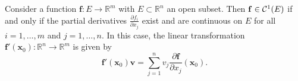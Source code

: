 \begin{thm}
  \label{thm:continuousParitialDerivativesImplyDifferentiability}
  Consider a function $\mathbf{f}: E\rightarrow \mathbb{R}^m$
  with $E\subset \mathbb{R}^n$ an open subset.
  Then $\mathbf{f}\in {\cal C}^1(E)$
  if and only if the partial derivatives $\frac{\partial f_i}{\partial x_j}$
  exist and are continuous on $E$ for all $i=1,\ldots,m$ and $j=1,\ldots,n$.
  In this case, the linear transformation
  $\mathbf{f}'(\mathbf{x}_0): \mathbb{R}^n \rightarrow \mathbb{R}^m$ is given by
  \begin{equation}
    \label{eq:continuousParitialDerivativesImplyDifferentiability}
    \mathbf{f}'(\mathbf{x}_0) \mathbf{v}
    = \sum_{j=1}^n v_j \frac{\partial \mathbf{f}}{\partial x_j} (\mathbf{x}_0).
  \end{equation}
\end{thm}
